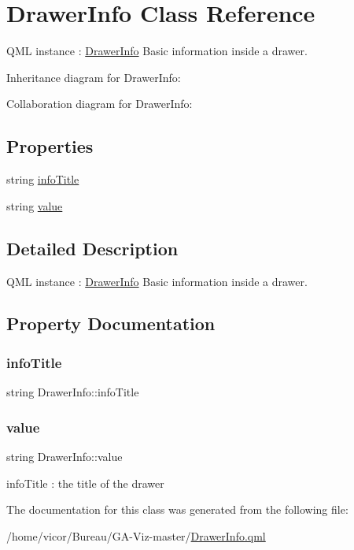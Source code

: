 \hypertarget{class_drawer_info}{}\section{Drawer\+Info Class Reference}
\label{class_drawer_info}


Q\+ML instance \+: \hyperlink{class_drawer_info}{Drawer\+Info} Basic information inside a drawer.  




Inheritance diagram for Drawer\+Info\+:


Collaboration diagram for Drawer\+Info\+:
\subsection*{Properties}
\begin{DoxyCompactItemize}
\item 
string \hyperlink{class_drawer_info_a47107ce66d0bc6196fb16dc66c48aad7}{info\+Title}
\item 
string \hyperlink{class_drawer_info_adc42d19634c2b16b60312deec71e1bbc}{value}
\end{DoxyCompactItemize}


\subsection{Detailed Description}
Q\+ML instance \+: \hyperlink{class_drawer_info}{Drawer\+Info} Basic information inside a drawer. 

\subsection{Property Documentation}
\mbox{\label{class_drawer_info_a47107ce66d0bc6196fb16dc66c48aad7}} 
\subsubsection{\texorpdfstring{info\+Title}{infoTitle}}
{\footnotesize\ttfamily string Drawer\+Info\+::info\+Title}

\mbox{\label{class_drawer_info_adc42d19634c2b16b60312deec71e1bbc}} 
\subsubsection{\texorpdfstring{value}{value}}
{\footnotesize\ttfamily string Drawer\+Info\+::value}

info\+Title \+: the title of the drawer 

The documentation for this class was generated from the following file\+:\begin{DoxyCompactItemize}
\item 
/home/vicor/\+Bureau/\+G\+A-\/\+Viz-\/master/\hyperlink{_drawer_info_8qml}{Drawer\+Info.\+qml}\end{DoxyCompactItemize}
